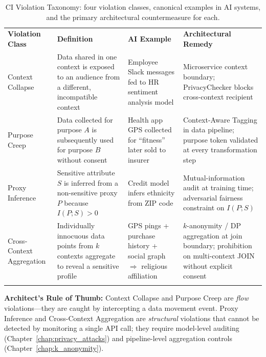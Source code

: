 \begin{table}[ht]
\centering
\caption{CI Violation Taxonomy: four violation classes, canonical examples in AI systems, and the primary architectural countermeasure for each.}
\label{tab:ci_violation_taxonomy}
\renewcommand{\arraystretch}{1.3}
\begin{tabular}{p{2.8cm} p{3.2cm} p{2.8cm} p{3.5cm}}
\hline\noalign{\smallskip}
\textbf{Violation Class} & \textbf{Definition} & \textbf{AI Example} & \textbf{Architectural Remedy} \\
\noalign{\smallskip}\svhline\noalign{\smallskip}
Context Collapse & Data shared in one context is exposed to an audience from a different, incompatible context & Employee Slack messages fed to HR sentiment analysis model & Microservice context boundary; PrivacyChecker blocks cross-context recipient \\[4pt]
Purpose Creep & Data collected for purpose $A$ is subsequently used for purpose $B$ without consent & Health app GPS collected for ``fitness'' later sold to insurer & Context-Aware Tagging in data pipeline; purpose token validated at every transformation step \\[4pt]
Proxy Inference & Sensitive attribute $S$ is inferred from a non-sensitive proxy $P$ because $I(P;S) > 0$ & Credit model infers ethnicity from ZIP code & Mutual-information audit at training time; adversarial fairness constraint on $I(P;S)$ \\[4pt]
Cross-Context Aggregation & Individually innocuous data points from $k$ contexts aggregate to reveal a sensitive profile & GPS pings + purchase history + social graph $\Rightarrow$ religious affiliation & $k$-anonymity / DP aggregation at join boundary; prohibition on multi-context JOIN without explicit consent \\
\noalign{\smallskip}\hline\noalign{\smallskip}
\end{tabular}
\end{table}

\begin{svgraybox}
\textbf{Architect's Rule of Thumb:} Context Collapse and Purpose Creep are \emph{flow} violations---they are caught by intercepting a data movement event. Proxy Inference and Cross-Context Aggregation are \emph{structural} violations that cannot be detected by monitoring a single API call; they require model-level auditing (Chapter~\ref{chap:privacy_attacks}) and pipeline-level aggregation controls (Chapter~\ref{chap:k_anonymity}).
\end{svgraybox}

